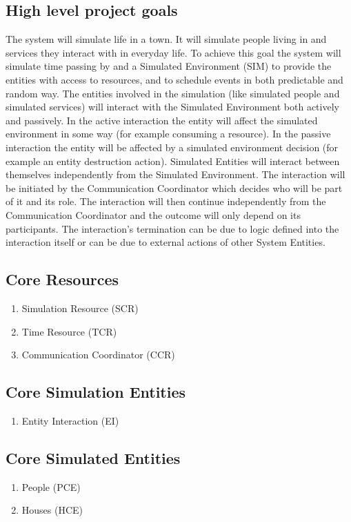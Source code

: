 \subsection{High level project goals} 
The system will simulate life in a town. It will simulate people living in and
services they interact with in everyday life. 
To achieve this goal the system will simulate time passing by and a Simulated
Environment (SIM) to provide the entities with access to resources, and to
schedule events in both predictable and random way.
The entities involved in the simulation (like simulated people and simulated
services) will interact with the Simulated Environment both actively and
passively. 
In the active interaction the entity will affect the simulated environment in
some way (for example consuming a resource). 
In the passive interaction the entity will be affected by a simulated
environment decision (for example an entity destruction action).
Simulated Entities will interact between themselves independently from the
Simulated Environment. The interaction will be initiated by the Communication
Coordinator which decides who will be part of it and its role. The
interaction will then continue independently from the Communication Coordinator
and the outcome will only depend on its participants. The interaction's
termination can be due to logic defined into the interaction itself or can be
due to external actions of other System Entities.

\subsection{Core Resources} 
\begin{enumerate}
\item Simulation Resource (SCR)
\item Time Resource (TCR)
\item Communication Coordinator (CCR)
\end{enumerate}

\subsection{Core Simulation Entities} 
\begin{enumerate}
\item Entity Interaction (EI)
\end{enumerate}

\subsection{Core Simulated Entities} 
\begin{enumerate}
\item People (PCE)
\item Houses (HCE)
\end{enumerate}


